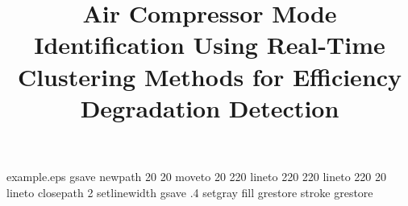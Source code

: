 %
%
%
%
%
\begin{filecontents*}{example.eps}
gsave
newpath
  20 20 moveto
  20 220 lineto
  220 220 lineto
  220 20 lineto
closepath
2 setlinewidth
gsave
  .4 setgray fill
grestore
stroke
grestore
\end{filecontents*}
%
\RequirePackage{fix-cm}
%
\documentclass[twocolumn]{svjour3}          %
%
\smartqed  %
%
\usepackage{graphicx}
%
\usepackage{mathptmx}      %
%
%
\usepackage{natbib} %
\usepackage{hyperref}



\usepackage{booktabs}
\usepackage{multirow}
\usepackage{tabularx}
\usepackage{longtable}
\usepackage{lipsum}
\usepackage{lscape}
\usepackage{siunitx}
\usepackage{amsmath}
%
%


\title{Air Compressor Mode Identification Using Real-Time Clustering Methods for Efficiency Degradation Detection%
}


